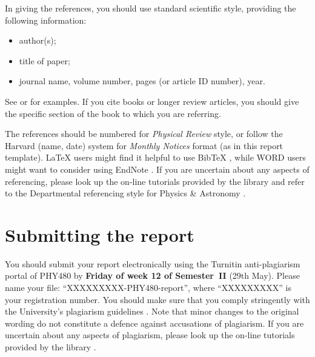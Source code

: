 \documentclass[a4paper,fleqn,usenatbib]{mnras}
\begin{document}
In giving the references, you should use standard scientific style, providing the following information: 
\begin{itemize}
\item author(s);
\item title of paper;
\item journal name, volume number, pages (or article ID number), year.
\end{itemize}
See \citet{Dyson} or  \citet{Einstein} for examples. If you cite books \citep{good book} or longer review articles, you should give the specific section of the book to which you are referring. 


The references should be numbered for \textit{Physical Review} style, or follow the Harvard (name, date) system for  \textit{Monthly Notices} format (as in this report template). LaTeX users might find it helpful to use BibTeX \citep{BibteX}, while WORD users might want to consider using EndNote \citep{Endnote}.
If you are uncertain about any aspects of referencing, please look up the on-line tutorials provided by the library and refer to the Departmental referencing style for Physics \& Astronomy \citep{Referencing}. 




\section{Submitting the report}


You should submit your report electronically using the Turnitin anti-plagiarism portal of PHY480 by \textbf{Friday of week 12 of Semester~II} (29th May). Please name your file: ``XXXXXXXXX-PHY480-report'', where ``XXXXXXXXX'' is your registration number. You should make sure that you comply stringently with the University's plagiarism guidelines \citep{plagiarism}. Note that minor changes to the original wording do not constitute a defence against accusations of plagiarism. If you are uncertain about any aspects of  plagiarism, please look up the on-line tutorials provided by the library \citep{Referencing}. 
\end{document}
